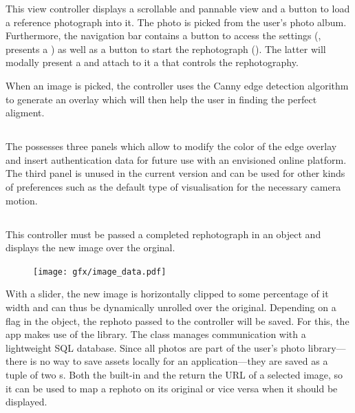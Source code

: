 This view controller displays a scrollable and pannable view and a button
 to load a reference photograph into it. The
photo is picked from the user's photo album.  Furthermore, the navigation bar
contains a button to access the settings
(, presents a
) as well as a button to start the rephotograph
(). The latter
will modally present a  and attach to it a
 that controls the rephotography.

When an image is picked, the controller uses the Canny edge detection algorithm
\citep{canny1986} to generate an overlay which will then help the user in
finding the perfect aligment.

\subsection*{}

The  possesses three panels which allow to
modify the color of the edge overlay and insert authentication data for
future use with an envisioned online platform. The third panel is unused in the current
version and can be used for other kinds of preferences such as the default type
of visualisation for the necessary camera motion.

\subsection*{}

This controller must be passed a completed rephotograph in an 
object and displays the new image over the orginal. 
\begin{figure}
   \texttt{[image: gfx/image\_data.pdf]}
\end{figure}
With a slider, the new image
is horizontally clipped to some percentage of it width and can thus be
dynamically unrolled over the original. Depending on a flag in the
 object, the rephoto passed to the controller will be saved. For
this, the app makes use of the  library. The  class
manages communication with a lightweight SQL database. Since all photos are
part of the user's photo library---there is no way to save assets locally for an
application---they are saved as a tuple of two s. Both the built-in
 and the  return
the URL of a selected image, so it can be used to map a rephoto on its original
or vice versa when it should be displayed.

